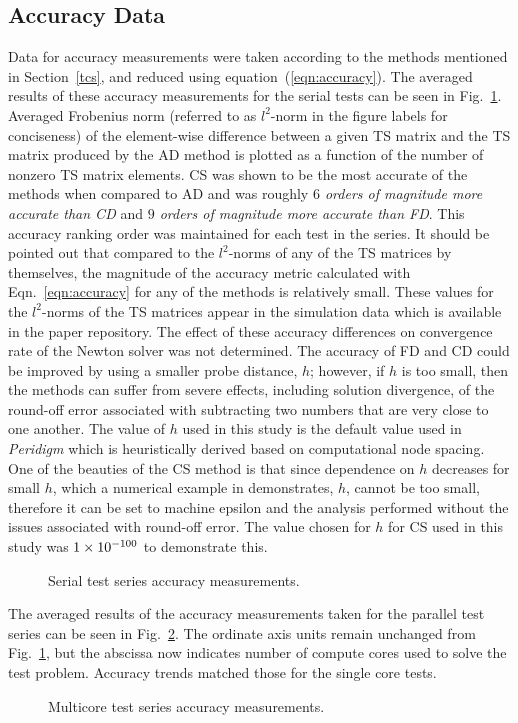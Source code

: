 \documentclass[preprint,12pt]{elsarticle}
\begin{document}
\subsection{Accuracy Data}

Data for accuracy measurements were taken according to the methods mentioned in
Section~\ref{tcs}, and reduced using equation~(\ref{eqn:accuracy}). The
averaged results of these accuracy measurements for the serial tests can be
seen in Fig.~\ref{fig:serial_accuracy}. Averaged Frobenius norm (referred to as
$l^2$-norm in the figure labels for conciseness) of the element-wise difference
between a given TS matrix and the TS matrix produced by the AD method is
plotted as a function of the number of nonzero TS matrix elements. CS was shown
to be the most accurate of the methods when compared to AD and was roughly
\emph{$6$ orders of magnitude more accurate than CD} and \emph{$9$ orders of
magnitude more accurate than FD}. This accuracy ranking order was maintained
for each test in the series. It should be pointed out that compared to the
$l^2$-norms of any of the TS matrices by themselves, the magnitude of the
accuracy metric calculated with Eqn.~\ref{eqn:accuracy} for any of the methods
is relatively small. These values for the $l^2$-norms of the TS matrices appear
in the simulation data which is available in the paper repository. The effect
of these accuracy differences on convergence rate of the Newton solver was not
determined.  
%
The accuracy of FD and CD could be improved by using a smaller probe distance,
$h$; however, if $h$ is too small, then the methods can suffer from severe
effects, including solution divergence, of the round-off error associated with
subtracting two numbers that are very close to one another.  The value of $h$
used in this study is the default value used in \emph{Peridigm} which is
heuristically derived based on computational node spacing.  One of the beauties
of the CS method is that since dependence on $h$ decreases for small $h$, which
a numerical example in \cite[Table 1]{squire1998using} demonstrates, $h$,
cannot be too small, therefore it can be set to machine epsilon and the
analysis performed without the issues associated with round-off error. The
value chosen for $h$ for CS used in this study was $\num{1.E-100}$ to
demonstrate this.
%
\begin{figure}[tbp] \centering
\scalebox{1.0}{} \caption{Serial test series
accuracy measurements.} \label{fig:serial_accuracy} \end{figure}
%
The averaged results of the accuracy measurements taken for the parallel test
series can be seen in Fig.~\ref{fig:multi_accuracy}. The ordinate axis units
remain unchanged from Fig.~\ref{fig:serial_accuracy}, but the abscissa now
indicates number of compute cores used to solve the test problem. Accuracy
trends matched those for the single core tests. 
%
\begin{figure}[tbp] \centering
\scalebox{1.0}{} \caption{Multicore test
series accuracy measurements.} \label{fig:multi_accuracy} \end{figure}
\end{document}
